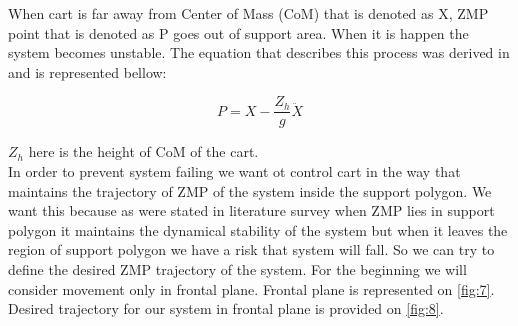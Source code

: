 \documentclass[12pt,a4paper]{report}
\begin{document}
		When cart is far away from Center of Mass (CoM) that is denoted as X, ZMP point that is denoted as P goes out of support area. When it is happen the system becomes unstable.
		The equation that describes this process was derived in \cite{kajita2003biped} and is represented bellow:
		
		\begin{equation}
			P = X -\dfrac{Z_h}{g} \ddot{X}
		\end{equation}
		
		$Z_h$ here is the height of CoM of the cart.\\
		In order to prevent system failing we want ot control cart in the way that maintains the trajectory of ZMP of the system inside the support polygon. We want this because as were stated in literature survey when ZMP lies in support polygon it maintains the dynamical stability of the system but when it leaves the region of support polygon we have a risk that system will fall. So we can try to define the desired ZMP trajectory of the system. For the beginning we will consider movement only in frontal plane. Frontal plane is represented on \cref{fig:7}. Desired trajectory for our system in frontal plane is provided on \ref{fig:8}.
		
\end{document}
